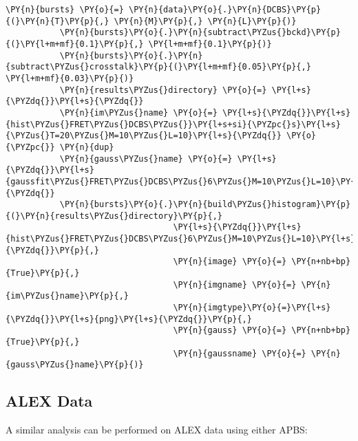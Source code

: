 \begin{Verbatim}[commandchars=\\\{\}, fontsize=\scriptsize]
           \PY{n}{bursts} \PY{o}{=} \PY{n}{data}\PY{o}{.}\PY{n}{DCBS}\PY{p}{(}\PY{n}{T}\PY{p}{,} \PY{n}{M}\PY{p}{,} \PY{n}{L}\PY{p}{)}
           \PY{n}{bursts}\PY{o}{.}\PY{n}{subtract\PYZus{}bckd}\PY{p}{(}\PY{l+m+mf}{0.1}\PY{p}{,} \PY{l+m+mf}{0.1}\PY{p}{)}
           \PY{n}{bursts}\PY{o}{.}\PY{n}{subtract\PYZus{}crosstalk}\PY{p}{(}\PY{l+m+mf}{0.05}\PY{p}{,} \PY{l+m+mf}{0.03}\PY{p}{)}
           \PY{n}{results\PYZus{}directory} \PY{o}{=} \PY{l+s}{\PYZdq{}}\PY{l+s}{\PYZdq{}}
           \PY{n}{im\PYZus{}name} \PY{o}{=} \PY{l+s}{\PYZdq{}}\PY{l+s}{hist\PYZus{}FRET\PYZus{}DCBS\PYZus{}}\PY{l+s+si}{\PYZpc{}s}\PY{l+s}{\PYZus{}T=20\PYZus{}M=10\PYZus{}L=10}\PY{l+s}{\PYZdq{}} \PY{o}{\PYZpc{}} \PY{n}{dup}
           \PY{n}{gauss\PYZus{}name} \PY{o}{=} \PY{l+s}{\PYZdq{}}\PY{l+s}{gaussfit\PYZus{}FRET\PYZus{}DCBS\PYZus{}6\PYZus{}M=10\PYZus{}L=10}\PY{l+s}{\PYZdq{}}
           \PY{n}{bursts}\PY{o}{.}\PY{n}{build\PYZus{}histogram}\PY{p}{(}\PY{n}{results\PYZus{}directory}\PY{p}{,} 
                                  \PY{l+s}{\PYZdq{}}\PY{l+s}{hist\PYZus{}FRET\PYZus{}DCBS\PYZus{}6\PYZus{}M=10\PYZus{}L=10}\PY{l+s}{\PYZdq{}}\PY{p}{,} 
                                  \PY{n}{image} \PY{o}{=} \PY{n+nb+bp}{True}\PY{p}{,} 
                                  \PY{n}{imgname} \PY{o}{=} \PY{n}{im\PYZus{}name}\PY{p}{,} 
                                  \PY{n}{imgtype}\PY{o}{=}\PY{l+s}{\PYZdq{}}\PY{l+s}{png}\PY{l+s}{\PYZdq{}}\PY{p}{,} 
                                  \PY{n}{gauss} \PY{o}{=} \PY{n+nb+bp}{True}\PY{p}{,} 
                                  \PY{n}{gaussname} \PY{o}{=} \PY{n}{gauss\PYZus{}name}\PY{p}{)}
\end{Verbatim}

\subsection{ALEX Data}
A similar analysis can be performed on ALEX data using either APBS:

